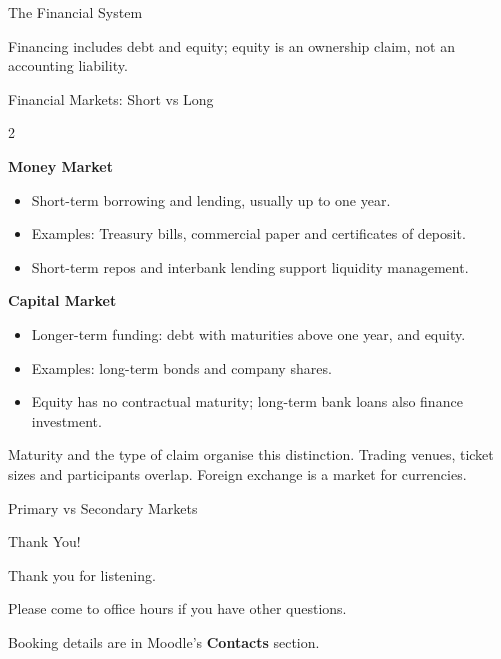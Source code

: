 \documentclass[9pt,aspectratio=169]{beamer}
\begin{document}
\begin{frame}{The Financial System}
\centering

\par\vspace{0.3em}
{\footnotesize Financing includes debt and equity; equity is an ownership claim, not an accounting liability.\par}
\end{frame}

\begin{frame}{Financial Markets: Short vs Long}
\begin{multicols}{2}

\textbf{Money Market}
\begin{itemize}
    \item Short-term borrowing and lending, usually up to one year.
    \item Examples: Treasury bills, commercial paper and certificates of deposit.
    \item Short-term repos and interbank lending support liquidity management.
\end{itemize}

\columnbreak

\textbf{Capital Market}
\begin{itemize}
    \item Longer-term funding: debt with maturities above one year, and equity.
    \item Examples: long-term bonds and company shares.
    \item Equity has no contractual maturity; long-term bank loans also finance investment.
\end{itemize}

\end{multicols}
\vspace{0.6em}
Maturity and the type of claim organise this distinction. Trading venues, ticket sizes and participants overlap. Foreign exchange is a market for currencies.
\end{frame}

\begin{frame}{Primary vs Secondary Markets}
\centering

\end{frame}



\begin{frame}{Thank You!}
\begin{center}
{\Large\textcolor{StAndrewsBlue}{Thank you for listening.}\par}
\vspace{0.8em}
Please come to office hours if you have other questions.\par
\smallskip
Booking details are in Moodle's \textbf{Contacts} section.
\end{center}
\end{frame}
\end{document}
